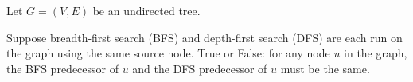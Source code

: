 \begin{prob}

    Let $G = (V, E)$ be an undirected tree.

    Suppose breadth-first search (BFS) and depth-first search (DFS) are each
    run on the graph using the same source node. True or False: for any node
    $u$ in the graph, the BFS predecessor of $u$ and the DFS predecessor of $u$
    must be the same.

    \Tf{}

\end{prob}

